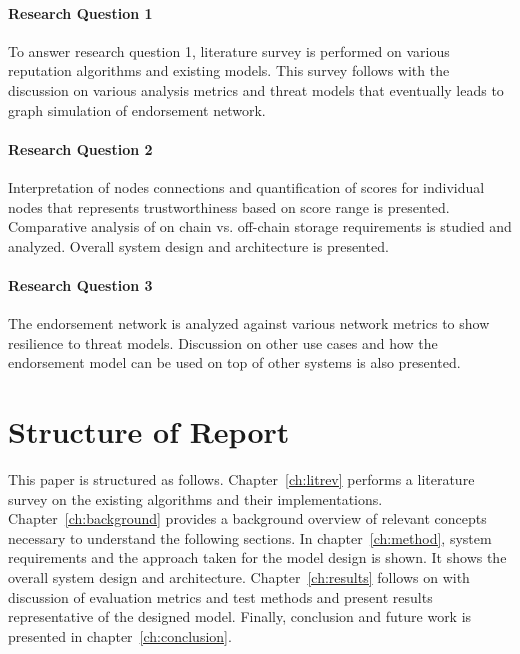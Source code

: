 \paragraph{Research Question 1}
To answer research question 1, literature survey is performed on various
reputation algorithms and existing models. This survey follows with the
discussion on various analysis metrics and threat models that eventually leads
to graph simulation of endorsement network.  

\paragraph{Research Question 2 } 
Interpretation of nodes connections and quantification of scores for individual
nodes that represents trustworthiness based on score range is presented.
Comparative analysis of on chain vs. off-chain storage requirements is studied
and analyzed. Overall system design and architecture is presented. 

\paragraph{Research Question 3} 
The endorsement network is analyzed against various network metrics to show
resilience to threat models. Discussion on other use cases and how the
endorsement model can be used on top of other systems is also presented.

%
%


\section{Structure of Report}
This paper is structured as follows. Chapter~\ref{ch:litrev} performs a
literature survey on the existing algorithms and their implementations.
Chapter~\ref{ch:background} provides a background overview of relevant concepts
necessary to understand the following sections. In chapter~\ref{ch:method},
system requirements and the approach taken for the model design is shown. It
shows the overall system design and architecture. Chapter~\ref{ch:results}
follows on with discussion of evaluation metrics and test methods and present
results representative of the designed model. Finally, conclusion and future
work is presented in chapter~\ref{ch:conclusion}. 
